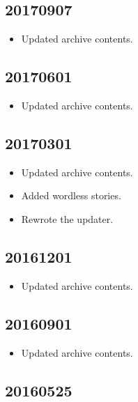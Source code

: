 \documentclass[hidelinks,a4paper,12pt]{article}
\begin{document}
\subsection{20170907}  \label{sec:changelog_20170907}

\begin{itemize}
\item Updated archive contents.
\end{itemize}

\subsection{20170601}  \label{sec:changelog_20170601}

\begin{itemize}
\item Updated archive contents.
\end{itemize}

\subsection{20170301}  \label{sec:changelog_20170301}

\begin{itemize}
\item Updated archive contents.
\item Added wordless stories.
\item Rewrote the updater.
\end{itemize}

\subsection{20161201}  \label{sec:changelog_20161201}

\begin{itemize}
\item Updated archive contents.
\end{itemize}

\subsection{20160901}  \label{sec:changelog_20160901}

\begin{itemize}
\item Updated archive contents.
\end{itemize}

\subsection{20160525}  \label{sec:changelog_20160525}
\end{document}
